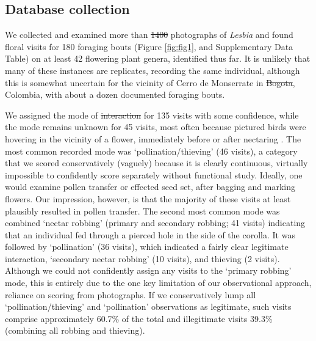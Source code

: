\documentclass[fleqn,10pt,lineno]{wlpeerj}
\providecommand{\DIFaddtex}[1]{{\protect\color{blue}\uwave{#1}}} %
\providecommand{\DIFdeltex}[1]{{\protect\color{red}\sout{#1}}}                      %
\providecommand{\DIFaddbegin}{} %
\providecommand{\DIFaddend}{} %
\providecommand{\DIFdelbegin}{} %
\providecommand{\DIFdelend}{} %
\providecommand{\DIFadd}[1]{\texorpdfstring{\DIFaddtex{#1}}{#1}} %
\providecommand{\DIFdel}[1]{\texorpdfstring{\DIFdeltex{#1}}{}} %
\begin{document}
\subsection*{Database collection}
We collected and examined more than \DIFdelbegin \DIFdel{1400 }\DIFdelend \DIFaddbegin \DIFadd{1550 }\DIFaddend photographs of \textit{Lesbia} and found floral visits for 180 foraging bouts (Figure \ref{fig:fig1}, and Supplementary Data Table) on at least 42 flowering plant genera, identified thus far. %
It is unlikely that many of these instances are replicates, recording the same individual, although this is somewhat uncertain for the vicinity of Cerro de Monserrate in \DIFdelbegin \DIFdel{Bogota}\DIFdelend \DIFaddbegin \DIFadd{Bogot\'a}\DIFaddend , Colombia, with about a dozen documented foraging bouts. 

We assigned the mode of \DIFdelbegin \DIFdel{interaction }\DIFdelend \DIFaddbegin \DIFadd{visitation }\DIFaddend for 135 visits with some confidence, while the mode remains unknown for 45 visits, most often because pictured birds were hovering in the vicinity of a flower, immediately before or after nectaring \DIFaddbegin \DIFadd{(Table \ref{tab:contingency-table})}\DIFaddend .
The most common recorded mode was `pollination/thieving' (46 visits), a category that we scored conservatively (vaguely) because it is clearly continuous, virtually impossible to confidently score separately without functional study. 
Ideally, one would examine pollen transfer or effected seed set, after bagging and marking flowers.
Our impression, however, is that the majority of these visits at least plausibly resulted in pollen transfer. 
The second most common mode was combined `nectar robbing' (primary and secondary robbing; 41 visits) indicating that an individual fed through a pierced hole in the side of the corolla.
It was followed by `pollination' (36 visits), which indicated a fairly clear legitimate interaction, `secondary nectar robbing' (10 visits), and thieving (2 visits). 
Although we could not confidently assign any visits to the `primary robbing' mode, this is entirely due to the one key limitation of our observational approach, reliance on scoring from photographs.
If we conservatively lump all `pollination/thieving' and `pollination' observations as legitimate, such visits comprise approximately 60.7\% of the total and illegitimate visits 39.3\% (combining all robbing and thieving).
\end{document}
